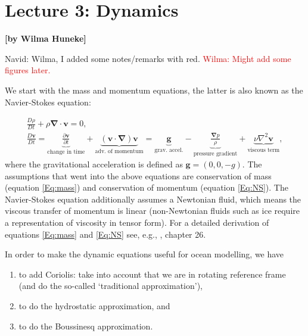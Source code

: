 
\section{Lecture 3: Dynamics}
\begin{flushright}\textbf{[by Wilma Huneke]}\end{flushright}

{\color{red}Navid: Wilma, I added some notes/remarks with red.}
\textcolor{red}{Wilma: Might add some figures later.}

We start with the mass and momentum equations, the latter is also known as the Navier-Stokes equation:

\begin{gather}
\frac{D\rho}{Dt} + \rho\boldsymbol{\nabla} \cdot \boldsymbol{v} = 0,
\label{Eq:mass} \\
\frac{D\boldsymbol{v}}{Dt} = \underbrace{\frac{\partial \boldsymbol{v}}{\partial t}}_{\text{change in time}} + \underbrace{\left( \boldsymbol{v}\cdot \boldsymbol{\nabla}\right)\boldsymbol{v}}_{\text{adv. of momentum}} = \underbrace{\boldsymbol{g}}_{\text{grav. accel.}} - \underbrace{\frac{\boldsymbol{\nabla} p}{\rho}}_{\text{pressure gradient}} + \underbrace{\nu\nabla^2 \boldsymbol{v}}_{\text{viscous term}},
\label{Eq:NS}
\end{gather}
where the gravitational acceleration is defined as $\boldsymbol{g}= (0,0,-g)$.
The assumptions that went into the above equations are conservation of mass (equation \ref{Eq:mass}) and conservation of momentum (equation \ref{Eq:NS}). The Navier-Stokes equation additionally assumes a Newtonian fluid, which means the viscous transfer of momentum is linear (non-Newtonian fluids such as ice require a representation of viscosity in tensor form). For a detailed derivation of equations \ref{Eq:mass} and \ref{Eq:NS} see, e.g., \citet{Griffies2019}, chapter 26.


In order to make the dynamic equations useful for ocean modelling, we have
\begin{enumerate}
\item to add Coriolis: take into account that we are in rotating reference frame (and do the so-called `traditional approximation'), 
\item to do the hydrostatic approximation, and
\item to do the Boussinesq approximation.
\end{enumerate}

